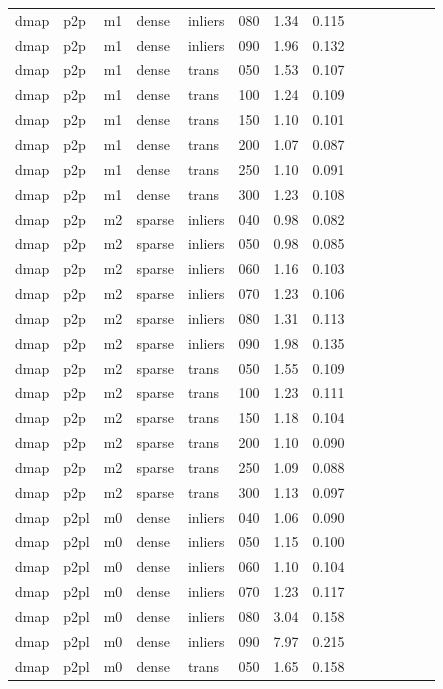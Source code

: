 \begin{table}[htbp]
\begin{tabular}{llllllrrrrrrrr}
  dmap & p2p & m1 & dense & inliers & 080 & 1.34 & 0.115 \\
  dmap & p2p & m1 & dense & inliers & 090 & 1.96 & 0.132 \\
  dmap & p2p & m1 & dense & trans & 050 & 1.53 & 0.107 \\
  dmap & p2p & m1 & dense & trans & 100 & 1.24 & 0.109 \\
  dmap & p2p & m1 & dense & trans & 150 & 1.10 & 0.101 \\
  dmap & p2p & m1 & dense & trans & 200 & 1.07 & 0.087 \\
  dmap & p2p & m1 & dense & trans & 250 & 1.10 & 0.091 \\
  dmap & p2p & m1 & dense & trans & 300 & 1.23 & 0.108 \\
  dmap & p2p & m2 & sparse & inliers & 040 & 0.98 & 0.082 \\
  dmap & p2p & m2 & sparse & inliers & 050 & 0.98 & 0.085 \\
  dmap & p2p & m2 & sparse & inliers & 060 & 1.16 & 0.103 \\
  dmap & p2p & m2 & sparse & inliers & 070 & 1.23 & 0.106 \\
  dmap & p2p & m2 & sparse & inliers & 080 & 1.31 & 0.113 \\
  dmap & p2p & m2 & sparse & inliers & 090 & 1.98 & 0.135 \\
  dmap & p2p & m2 & sparse & trans & 050 & 1.55 & 0.109 \\
  dmap & p2p & m2 & sparse & trans & 100 & 1.23 & 0.111 \\
  dmap & p2p & m2 & sparse & trans & 150 & 1.18 & 0.104 \\
  dmap & p2p & m2 & sparse & trans & 200 & 1.10 & 0.090 \\
  dmap & p2p & m2 & sparse & trans & 250 & 1.09 & 0.088 \\
  dmap & p2p & m2 & sparse & trans & 300 & 1.13 & 0.097 \\
  dmap & p2pl & m0 & dense & inliers & 040 & 1.06 & 0.090 \\
  dmap & p2pl & m0 & dense & inliers & 050 & 1.15 & 0.100 \\
  dmap & p2pl & m0 & dense & inliers & 060 & 1.10 & 0.104 \\
  dmap & p2pl & m0 & dense & inliers & 070 & 1.23 & 0.117 \\
  dmap & p2pl & m0 & dense & inliers & 080 & 3.04 & 0.158 \\
  dmap & p2pl & m0 & dense & inliers & 090 & 7.97 & 0.215 \\
  dmap & p2pl & m0 & dense & trans & 050 & 1.65 & 0.158 \\

\end{tabular}
\end{table}
